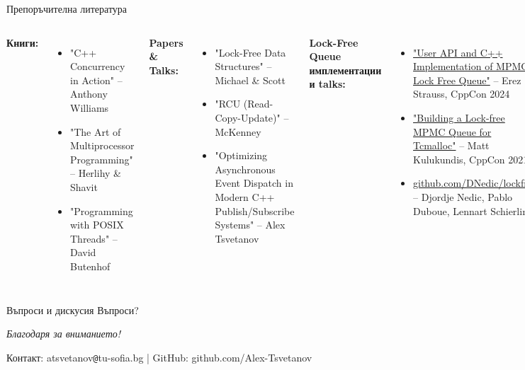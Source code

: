 \documentclass[aspectratio=169]{beamer}
\begin{document}
\begin{frame}{Препоръчителна литература}
\footnotesize
\begin{columns}
        \textbf{Книги:}
        \begin{itemize}
            \item "C++ Concurrency in Action" – Anthony Williams
            \item "The Art of Multiprocessor Programming" – Herlihy \& Shavit
            \item "Programming with POSIX Threads" – David Butenhof
        \end{itemize}
        \textbf{Papers \& Talks:}
        \begin{itemize}
            \item "Lock-Free Data Structures" – Michael \& Scott
            \item "RCU (Read-Copy-Update)" – McKenney
            \item "Optimizing Asynchronous Event Dispatch in Modern C++ Publish/Subscribe Systems" – Alex Tsvetanov
        \end{itemize}
        \textbf{Lock-Free Queue имплементации и talks:}
        \begin{itemize}
            \item \href{https://www.youtube.com/watch?v=bjz_bMNNWRk}{"User API and C++ Implementation of MPMC Lock Free Queue"} – Erez Strauss, CppCon 2024
            \item \href{https://www.youtube.com/watch?v=_qaKkHuHYE0}{"Building a Lock-free MPMC Queue for Tcmalloc"} – Matt Kulukundis, CppCon 2021
            \item \href{https://github.com/DNedic/lockfree}{github.com/DNedic/lockfree} – Djordje Nedic, Pablo Duboue, Lennart Schierling
        \end{itemize}
        
        \textbf{Online ресурси:}
        \begin{itemize}
            \item \href{https://en.cppreference.com}{cppreference.com} – coroutines, atomics, memory ordering
            \item \href{https://preshing.com}{preshing.com} – lock-free programming blog
            \item \href{https://www.1024cores.net/home/lock-free-algorithms}{1024cores.net} – Dmitry Vyukov's concurrency blog
        \end{itemize}
\end{columns}
\end{frame}

\begin{frame}{Въпроси и дискусия}
\centering
\Huge{Въпроси?}

\vspace{4cm}
\textit{Благодаря за вниманието!}

\vspace{0.5cm}
\small
Контакт: atsvetanov{\texttt{@}}tu-sofia.bg | GitHub: github.com/Alex-Tsvetanov
\end{frame}
\end{document}
